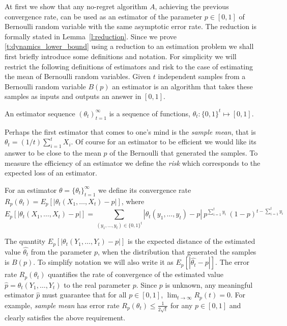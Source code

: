 At first we show that any no-regret algorithm $A$, achieving the previous
convergence rate, can be used as an estimator of the parameter
$p \in [0,1] $ of Bernoulli random variable with the same asymptotic error
rate. The reduction is formally stated in Lemma~\ref{l:reduction}.
Since we prove \ref{t:dynamics_lower_bound} using a reduction to
an estimation problem we shall first briefly introduce some definitions and
notation. For simplicity we will restrict the following definitions
of estimators and risk to the case of estimating the mean of Bernoulli
random variables.
Given $t$ independent samples from a Bernoulli random variable $B(p)$
an estimator is an algorithm that takes these samples as inputs and
outputs an answer in $[0,1]$.
\begin{definition}\label{d:estimator}
  An estimator sequence $(\theta_t)_{t=1}^{\infty}$
  is a sequence of functions, $\theta_t: \{0,1\}^t\mapsto [0,1]$.
\end{definition}
Perhaps the first estimator that comes to one's mind is the
\emph{sample mean}, that is $\theta_t=(1/t) \sum_{i=1}^t X_i$.
Of course for an estimator to be efficient we would like its answer to be
close to the mean $p$ of the Bernoulli that generated the samples.
To measure the efficiency of an estimator we define the \emph{risk}
which corresponds to the expected loss of an estimator.
\begin{definition}\label{d:risk}
  For an estimator $\theta =\{\theta_t\}_{t=1}^\infty$ we define
  its convergence rate
  $R_p(\theta_t) = E_p[|\theta_t(X_1,\ldots,X_t) - p|]$,
  where
  \[
    E_p[|\theta_t(X_1,\ldots,X_t) - p|]
    = \sum_{(y_1,\ldots,y_t)\in\{0,1\}^t}
    |\theta_t(y_1,\ldots,y_t) -p|\
    p^{\sum_{i=1}^t y_i}\ (1-p)^{t-\sum_{i=1}^t y_i}
  \]
\end{definition}
The quantity $E_p[|\theta_t(Y_1,\ldots,Y_t) - p|]$ is the expected distance
of the estimated value $\hat{\theta_t}$ from the parameter $p$, when the
distribution that generated the samples is $B(p)$.
To simplify notation we will also write it as $E_p[|\hat{\theta_t} - p|]$.
The error rate $R_p(\theta_t)$ quantifies the rate of
convergence of the estimated value $\hat{p} =\theta_t(Y_1,\ldots,Y_t)$ to the
real parameter $p$.  Since $p$ is unknown, any meaningful estimator $\hat{p}$
must guarantee that for all $p \in [0,1]$, $\lim_{t \to \infty} R_p(t)=0$.
For example, \emph{sample mean} has error rate
$R_p(\theta_t) \leq \frac{1}{2\sqrt{t}}$ for any $p \in [0,1]$ and clearly satisfies
the above requirement.

